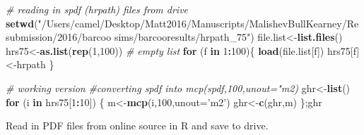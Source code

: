 \documentclass[10,portrait]{article}
\newenvironment{Shaded}{\begin{snugshade}}{\end{snugshade}}
\newcommand{\KeywordTok}[1]{\textcolor[rgb]{0.13,0.29,0.53}{\textbf{#1}}}
\newcommand{\DataTypeTok}[1]{\textcolor[rgb]{0.13,0.29,0.53}{#1}}
\newcommand{\DecValTok}[1]{\textcolor[rgb]{0.00,0.00,0.81}{#1}}
\newcommand{\StringTok}[1]{\textcolor[rgb]{0.31,0.60,0.02}{#1}}
\newcommand{\CommentTok}[1]{\textcolor[rgb]{0.56,0.35,0.01}{\textit{#1}}}
\newcommand{\ControlFlowTok}[1]{\textcolor[rgb]{0.13,0.29,0.53}{\textbf{#1}}}
\newcommand{\OperatorTok}[1]{\textcolor[rgb]{0.81,0.36,0.00}{\textbf{#1}}}
\newcommand{\NormalTok}[1]{#1}
\begin{document}
\begin{Shaded}
\begin{Highlighting}[]
\CommentTok{# reading in spdf (hrpath) files from drive}
\KeywordTok{setwd}\NormalTok{(}\StringTok{"/Users/camel/Desktop/Matt2016/Manuscripts/MalishevBullKearney/Resubmission/2016/barcoo sims/barcooresults/hrpath_75"}\NormalTok{)}
\NormalTok{file.list<-}\KeywordTok{list.files}\NormalTok{()}
\NormalTok{hrs75<-}\KeywordTok{as.list}\NormalTok{(}\KeywordTok{rep}\NormalTok{(}\DecValTok{1}\NormalTok{,}\DecValTok{100}\NormalTok{)) }\CommentTok{# empty list}
\ControlFlowTok{for}\NormalTok{ (f }\ControlFlowTok{in} \DecValTok{1}\OperatorTok{:}\DecValTok{100}\NormalTok{)\{}
  \KeywordTok{load}\NormalTok{(file.list[f])}
\NormalTok{  hrs75[f]<-hrpath}
\NormalTok{\}}

\CommentTok{# working version}
\CommentTok{#converting spdf into mcp(spdf,100,unout="m2)}
\NormalTok{ghr<-}\KeywordTok{list}\NormalTok{()}
\ControlFlowTok{for}\NormalTok{ (i }\ControlFlowTok{in}\NormalTok{ hrs75[}\DecValTok{1}\OperatorTok{:}\DecValTok{10}\NormalTok{]) \{}
\NormalTok{  m<-}\KeywordTok{mcp}\NormalTok{(i,}\DecValTok{100}\NormalTok{,}\DataTypeTok{unout=}\StringTok{'m2'}\NormalTok{)}
\NormalTok{  ghr<-}\KeywordTok{c}\NormalTok{(ghr,m)}
\NormalTok{\};ghr}
\end{Highlighting}
\end{Shaded}

Read in PDF files from online source in R and save to drive.
\end{document}
